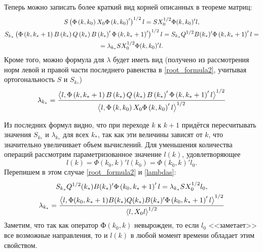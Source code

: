 \documentclass[10pt, a4paper]{article}
\begin{document}
Теперь можно записать более краткий вид корней описанных в теореме матриц: 
\begin{gather}
	\label{root_formula1} S\left(\Phi\left(k,k_0\right)X_0\Phi\left(k,k_0\right)'\right)^{1/2}l =
		SX_0^{1/2}\Phi(k,k_0)'l, \\ 
	\notag S_{k_*}\left(\Phi\left(k,k_*+1\right)B\left(k_*\right)Q\left(k_*\right)B\left(k_*\right)'\Phi\left(k,k_*+1\right)'\right)^{1/2}l 
		=  S_{k_*}Q^{1/2}B(k_*)'\Phi\left(k,k_*+1\right)'l = \\
		\label{root_formula2} = \lambda_{k_*} SX_0^{1/2}\Phi(k,k_0)'l.
\end{gather}
Кроме того, можно формула для $\lambda$ будет иметь вид (получено из рассмотрения норм левой и правой части последнего равенства в \eqref{root_formula2}, учитывая ортогональность $S$ и $S_{k_*}$)
\begin{equation}\label{lambdas}
	\lambda_{k_*} = \frac {\left<l,\Phi\left(k,k_*+1\right)B\left(k_*\right)Q\left(k_*\right)B\left(k_*\right)'\Phi\left(k,k_*+1\right)'l\right>^{1/2}}{\left<l,\Phi\left(k,k_0\right)X_0\Phi\left(k,k_0\right)'l\right>^{1/2}}
\end{equation}
\begin{note}
Из последних формул видно, что при переходе $k$ к $k+1$ придётся пересчитывать значения $S_{k_*}$ и $\lambda_{k_*}$ для всех $k_*$, так как эти величины зависят от $k$, что значительно увеличивает объем вычислений. Для уменьшения количества операций рассмотрим параметризованное значение $l(k)$, удовлетворяющее 
	\begin{equation}\label{newl}
		l(k)=\Phi(k_0,k)'l(k_0) = \Phi(k_0,k)'l_0.
	\end{equation}
	Перепишем в этом случае \eqref{root_formula2} и \eqref{lambdas}:
	\begin{gather}
		S_{k_*}Q^{1/2}(k_*)B(k_*)'\Phi\left(k_0,k_*+1\right)'l = \lambda_{k_*}SX_0^{1/2}l_0, \\
		\lambda_{k_*} =
			 \frac{\left<l,\Phi(k_0,k_*+1)B(k_*)Q(k_*)B(k_*)'\Phi\left(k_0,k_*+1\right)'l\right>^{1/2} }
			{\left<l,X_0l\right>^{1/2} }
	\end{gather}	
	Заметим, что так как оператор $Ф(k_0,k)$ невырожден, то если $l_0$ <<заметает>>  все возможные направления, то и $l(k)$ в любой момент времени обладает этим свойством.
\end{note}
\end{document}
